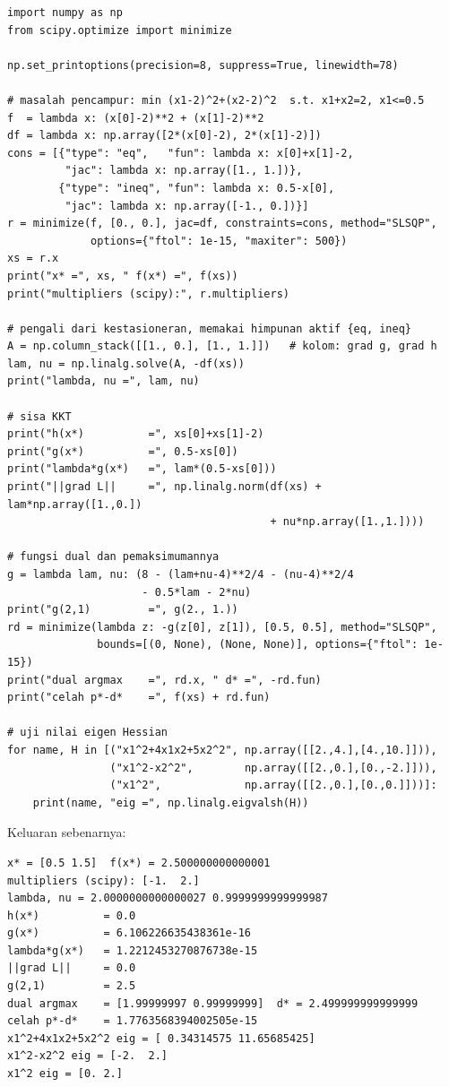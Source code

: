 \begin{lab}
\begin{verbatim}
import numpy as np
from scipy.optimize import minimize

np.set_printoptions(precision=8, suppress=True, linewidth=78)

# masalah pencampur: min (x1-2)^2+(x2-2)^2  s.t. x1+x2=2, x1<=0.5
f  = lambda x: (x[0]-2)**2 + (x[1]-2)**2
df = lambda x: np.array([2*(x[0]-2), 2*(x[1]-2)])
cons = [{"type": "eq",   "fun": lambda x: x[0]+x[1]-2,
         "jac": lambda x: np.array([1., 1.])},
        {"type": "ineq", "fun": lambda x: 0.5-x[0],
         "jac": lambda x: np.array([-1., 0.])}]
r = minimize(f, [0., 0.], jac=df, constraints=cons, method="SLSQP",
             options={"ftol": 1e-15, "maxiter": 500})
xs = r.x
print("x* =", xs, " f(x*) =", f(xs))
print("multipliers (scipy):", r.multipliers)

# pengali dari kestasioneran, memakai himpunan aktif {eq, ineq}
A = np.column_stack([[1., 0.], [1., 1.]])   # kolom: grad g, grad h
lam, nu = np.linalg.solve(A, -df(xs))
print("lambda, nu =", lam, nu)

# sisa KKT
print("h(x*)          =", xs[0]+xs[1]-2)
print("g(x*)          =", 0.5-xs[0])
print("lambda*g(x*)   =", lam*(0.5-xs[0]))
print("||grad L||     =", np.linalg.norm(df(xs) + lam*np.array([1.,0.])
                                         + nu*np.array([1.,1.])))

# fungsi dual dan pemaksimumannya
g = lambda lam, nu: (8 - (lam+nu-4)**2/4 - (nu-4)**2/4
                     - 0.5*lam - 2*nu)
print("g(2,1)         =", g(2., 1.))
rd = minimize(lambda z: -g(z[0], z[1]), [0.5, 0.5], method="SLSQP",
              bounds=[(0, None), (None, None)], options={"ftol": 1e-15})
print("dual argmax    =", rd.x, " d* =", -rd.fun)
print("celah p*-d*    =", f(xs) + rd.fun)

# uji nilai eigen Hessian
for name, H in [("x1^2+4x1x2+5x2^2", np.array([[2.,4.],[4.,10.]])),
                ("x1^2-x2^2",        np.array([[2.,0.],[0.,-2.]])),
                ("x1^2",             np.array([[2.,0.],[0.,0.]]))]:
    print(name, "eig =", np.linalg.eigvalsh(H))
\end{verbatim}
Keluaran sebenarnya:
\begin{verbatim}
x* = [0.5 1.5]  f(x*) = 2.500000000000001
multipliers (scipy): [-1.  2.]
lambda, nu = 2.0000000000000027 0.9999999999999987
h(x*)          = 0.0
g(x*)          = 6.106226635438361e-16
lambda*g(x*)   = 1.2212453270876738e-15
||grad L||     = 0.0
g(2,1)         = 2.5
dual argmax    = [1.99999997 0.99999999]  d* = 2.499999999999999
celah p*-d*    = 1.7763568394002505e-15
x1^2+4x1x2+5x2^2 eig = [ 0.34314575 11.65685425]
x1^2-x2^2 eig = [-2.  2.]
x1^2 eig = [0. 2.]
\end{verbatim}
\end{lab}


